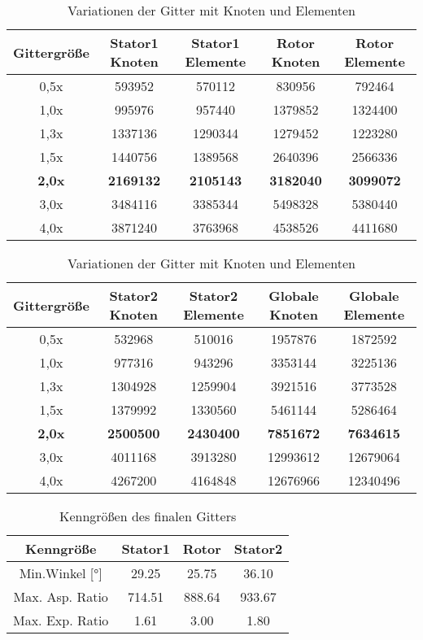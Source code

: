 \begin{table}[H]
\centering
\begin{tabular}[t]{ccccc}
\toprule
Gittergröße	& Stator1 Knoten &	Stator1 Elemente & 	Rotor Knoten &	Rotor Elemente  \\
\midrule

0,5x 	& 593952	& 570112 &	830956	& 792464 \\
1,0x   &	995976	& 957440	&1379852	& 1324400\\
1,3x	  & 1337136	&1290344	&1279452	&1223280\\
1,5x 	&1440756	&1389568	&2640396	&2566336\\
\textbf{2,0x  }	&\textbf{2169132}	&\textbf{2105143}	&\textbf{3182040}&	\textbf{3099072}\\
3,0x  	&3484116	&3385344&	5498328	&5380440\\
4,0x 	& 3871240 &	3763968	&4538526&	4411680\\

\bottomrule
\end{tabular}

\begin{tabular}[t]{ccccc}
\toprule
Gittergröße	& Stator2 Knoten &	Stator2 Elemente & 	Globale Knoten &	Globale Elemente  \\
\midrule
0,5x 	& 532968	& 510016 &	1957876	& 1872592 \\
1,0x   &	977316	& 943296	&3353144	& 3225136 \\
1,3x	  & 1304928	&1259904	&3921516	&3773528\\
1,5x 	&1379992	&1330560	&5461144	&5286464\\
\textbf{2,0x  }	&\textbf{2500500}	&\textbf{2430400}	&\textbf{7851672}&	\textbf{7634615}\\
3,0x  	&4011168	&3913280&	12993612	&12679064\\
4,0x 	& 4267200 &	4164848	&12676966&	12340496\\

\bottomrule
\end{tabular}
\caption{Variationen der Gitter mit Knoten und Elementen} \label{tab:Gittergroessen}
\end{table}

\begin{table}[H]
\centering


\begin{tabular}[t]{cccc}
\toprule
Kenngröße	& Stator1 & Rotor &	Stator2  \\
\midrule
Min.Winkel [°]	& 29.25	& 25.75 & 36.10 \\
Max. Asp. Ratio   &	714.51	& 888.64	& 933.67 \\
Max. Exp. Ratio	  & 1.61	& 3.00	&1.80 \\


\bottomrule
\end{tabular}
\caption{Kenngrößen des finalen Gitters} \label{tab:KenngroessenGitterFinal}
\end{table}


